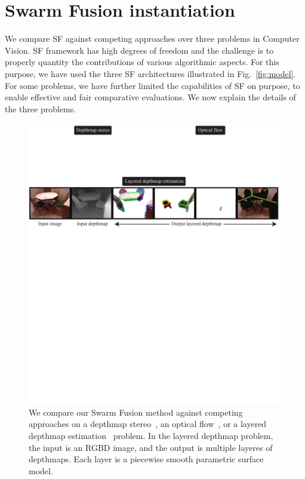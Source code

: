 \section{Swarm Fusion instantiation}
We compare SF against competing approaches over three problems in
Computer Vision. SF framework has high degrees of freedom and the
challenge is to properly quantity the contributions of various
algorithmic aspects. For this purpose, we have used the three SF
architectures illustrated in Fig.~\ref{fig:model}. For some problems, we
have further limited the capabilities of SF on purpose, to enable
effective and fair comparative evaluations. We now explain the details
of the three problems.

%
\begin{figure}[tb]
 \includegraphics[width=\columnwidth]{figure/problem.pdf} \caption{We
 compare our Swarm Fusion method against competing approaches on a
 depthmap stereo~\cite{middle_bury_stereo}, an optical
 flow~\cite{middlebury_optical_flow}, or a layered depthmap
 estimation~\cite{layered_depthmap} problem. In the layered depthmap
 problem, the input is an RGBD image, and the output is multiple layeres
 of depthmaps. Each layer is a piecewise smooth parametric surface
 model.}\label{fig:problem}
\end{figure}



